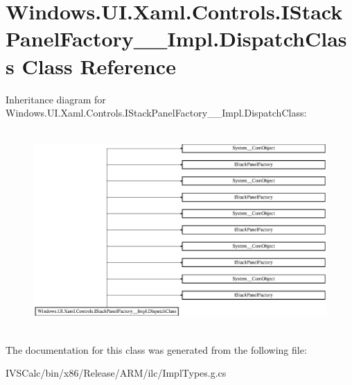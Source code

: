 \hypertarget{class_windows_1_1_u_i_1_1_xaml_1_1_controls_1_1_i_stack_panel_factory_____impl_1_1_dispatch_class}{}\section{Windows.\+U\+I.\+Xaml.\+Controls.\+I\+Stack\+Panel\+Factory\+\_\+\+\_\+\+Impl.\+Dispatch\+Class Class Reference}
\label{class_windows_1_1_u_i_1_1_xaml_1_1_controls_1_1_i_stack_panel_factory_____impl_1_1_dispatch_class}
Inheritance diagram for Windows.\+U\+I.\+Xaml.\+Controls.\+I\+Stack\+Panel\+Factory\+\_\+\+\_\+\+Impl.\+Dispatch\+Class\+:\begin{figure}[H]
\begin{center}
\leavevmode
\includegraphics[height=7.661692cm]{class_windows_1_1_u_i_1_1_xaml_1_1_controls_1_1_i_stack_panel_factory_____impl_1_1_dispatch_class}
\end{center}
\end{figure}


The documentation for this class was generated from the following file\+:\begin{DoxyCompactItemize}
\item 
I\+V\+S\+Calc/bin/x86/\+Release/\+A\+R\+M/ilc/Impl\+Types.\+g.\+cs\end{DoxyCompactItemize}
